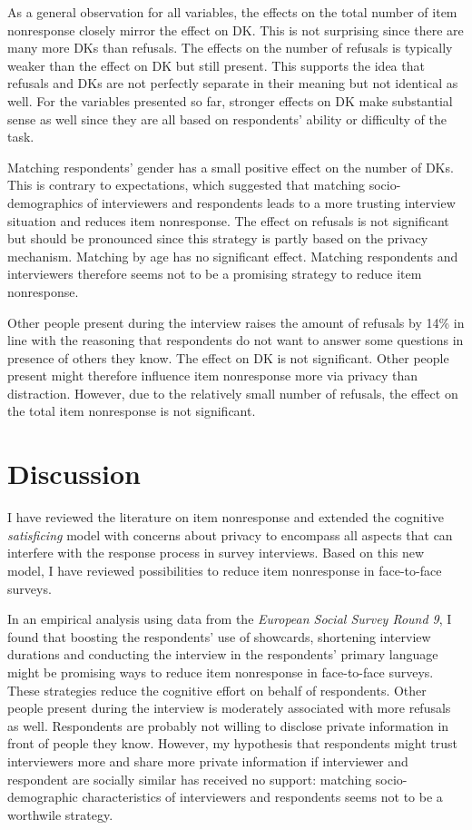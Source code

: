 \documentclass[a4paper,12pt]{article}
\begin{document}
As a general observation for all variables, the effects on the total number of item nonresponse closely mirror the effect on DK. This is not surprising since there are many more DKs than refusals. The effects on the number of refusals is typically weaker than the effect on DK but still present. This supports the idea that refusals and DKs are not perfectly separate in their meaning but not identical as well. For the variables presented so far, stronger effects on DK make substantial sense as well since they are all based on respondents' ability or difficulty of the task.

Matching respondents' gender has a small positive effect on the number of DKs. This is contrary to expectations, which suggested that matching socio-demographics of interviewers and respondents leads to a more trusting interview situation and reduces item nonresponse. The effect on refusals is not significant but should be pronounced since this strategy is partly based on the privacy mechanism. Matching by age has no significant effect. Matching respondents and interviewers therefore seems not to be a promising strategy to reduce item nonresponse.

Other people present during the interview raises the amount of refusals by 14\% in line with the reasoning that respondents do not want to answer some questions in presence of others they know. The effect on DK is not significant. Other people present might therefore influence item nonresponse more via privacy than distraction. However, due to the relatively small number of refusals, the effect on the total item nonresponse is not significant.


\section{Discussion}

I have reviewed the literature on item nonresponse and extended the cognitive \textit{satisficing} model \citep{krosnickResponseStrategiesCoping1991} with concerns about privacy to encompass all aspects that can interfere with the response process in survey interviews. Based on this new model, I have reviewed possibilities to reduce item nonresponse in face-to-face surveys.

In an empirical analysis using data from the \textit{European Social Survey Round 9}, I found that boosting the respondents' use of showcards, shortening interview durations and conducting the interview in the respondents' primary language might be promising ways to reduce item nonresponse in face-to-face surveys. These strategies reduce the cognitive effort on behalf of respondents. Other people present during the interview is moderately associated with more refusals as well. Respondents are probably not willing to disclose private information in front of people they know. However, my hypothesis that respondents might trust interviewers more and share more private information if interviewer and respondent are socially similar has received no support: matching socio-demographic characteristics of interviewers and respondents seems not to be a worthwile strategy.
\end{document}
